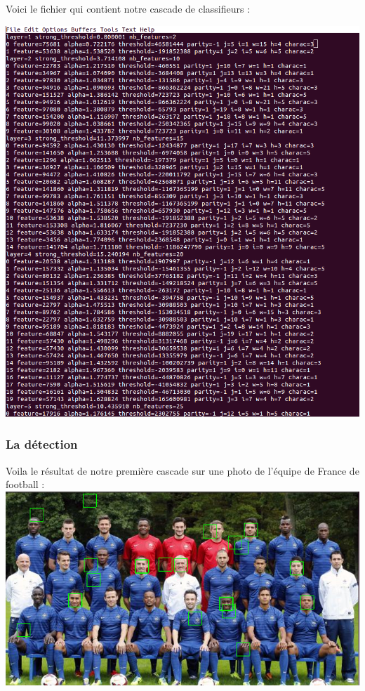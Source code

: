 \documentclass[12pt,a4paper]{article}
\begin{document}
Voici le fichier qui contient notre cascade de classifieurs :
\vspace{0.8cm}
\begin{center}
\includegraphics[scale=.4]{Pictures/cascade-file.png}
\end{center}


\newpage
\subsubsection{La détection}

Voila le résultat de notre première cascade sur une photo de l'équipe de France de football :
\vspace{0.8cm}
\newline
\includegraphics[scale=0.5]{Pictures/france.png}
\end{document}
